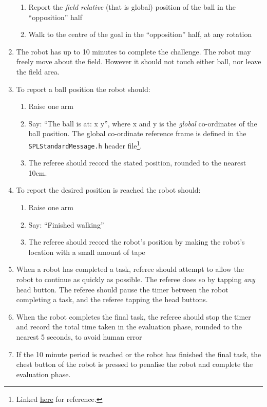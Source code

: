 \begin{enumerate}
\begin{enumerate}
        \item Report the \textit{field relative} (that is global) position of the ball in the ``opposition'' half
        \item Walk to the centre of the goal in the ``opposition'' half, at any rotation
    \end{enumerate}
    \item The robot has up to 10 minutes to complete the challenge. The robot may freely move about the field. However it should not touch either ball, nor leave the field area.
    \item To report a ball position the robot should:
    \begin{enumerate}
        \item Raise one arm
        \item Say: ``The ball is at: x y'', where x and y is the \textit{global} co-ordinates of the ball position. The global co-ordinate reference frame is defined in the \texttt{SPLStandardMessage.h} header file\footnote{Linked \href{https://github.com/bhuman/GameController/blob/master/include/SPLStandardMessage.h}{here} for reference.}.
        \item The referee should record the stated position, rounded to the nearest 10cm.
    \end{enumerate}
    \item To report the desired position is reached the robot should:
    \begin{enumerate}
        \item Raise one arm
        \item Say: ``Finished walking''
        \item The referee should record the robot's position by making the robot's location with a small amount of tape
    \end{enumerate}
    \item When a robot has completed a task, referee should attempt to allow the robot to continue as quickly as possible. The referee does so by tapping \textit{any} head button. The referee should pause the timer between the robot completing a task, and the referee tapping the head buttons.
    \item When the robot completes the final task, the referee should stop the timer and record the total time taken in the evaluation phase, rounded to the nearest 5 seconds, to avoid human error 
    \item If the 10 minute period is reached or the robot has finished the final task, the chest button of the robot is pressed to penalise the robot and complete the evaluation phase.

\end{enumerate}
